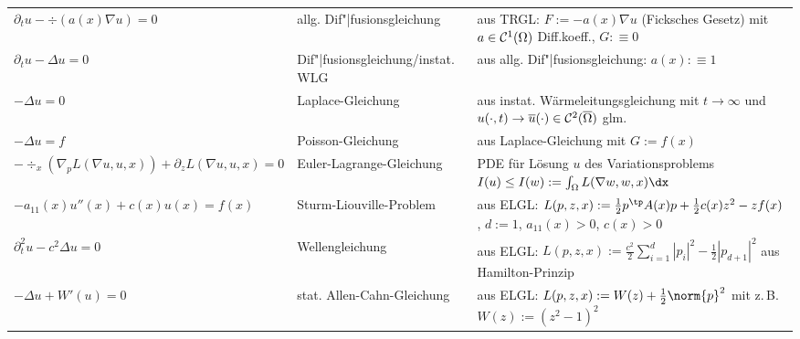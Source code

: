 \begin{landscape}
\begin{tabular}{p{65mm}p{55mm}p{128mm}}
        \midrule

        $\partial_t u - \div(a(x) \nabla u) = 0$&
        allg. Dif"|fusionsgleichung&
        aus TRGL: $F := -a(x) \nabla u$ (Ficksches Gesetz) mit $a \in \mathcal{C}^1(\Omega)$ Diff.koeff.,
        $G :\equiv 0$\\

        $\partial_t u - \Delta u = 0$&
        Dif"|fusionsgleichung/instat. WLG&
        aus allg. Dif"|fusionsgleichung: $a(x) :\equiv 1$\\

        $-\Delta u = 0$&
        Laplace-Gleichung&
        aus instat. Wärmeleitungsgleichung mit $t \to \infty$ und
        $u(\cdot, t) \to \overline{u}(\cdot) \in \mathcal{C}^2(\overline{\Omega})$ glm.\\

        $-\Delta u = f$&
        Poisson-Gleichung&
        aus Laplace-Gleichung mit $G := f(x)$\\

        \midrule

        $-\div_x(\nabla_p L(\nabla u, u, x)) + \partial_z L(\nabla u, u, x) = 0$&
        Euler-Lagrange-Gleichung&
        PDE für Lösung $u$ des Variationsproblems
        $I(u) \le I(w) := \int_\Omega L(\nabla w, w, x)\dx$\\

        $-a_{11}(x) u''(x) + c(x) u(x) = f(x)$&
        Sturm-Liouville-Problem&
        aus ELGL: $L(p, z, x) := \frac{1}{2} p^\tp A(x) p + \frac{1}{2} c(x) z^2 - z f(x)$,
        $d := 1$, $a_{11}(x) > 0$, $c(x) > 0$\\

        $\partial_t^2 u - c^2 \Delta u = 0$&
        Wellengleichung&
        aus ELGL: $L(p, z, x) := \frac{c^2}{2} \sum_{i=1}^d |p_i|^2 - \frac{1}{2} |p_{d+1}|^2$
        aus Hamilton-Prinzip\\

        $-\Delta u + W'(u) = 0$&
        stat. Allen-Cahn-Gleichung&
        aus ELGL: $L(p, z, x) := W(z) + \frac{1}{2} \norm{p}^2$ mit z.\,B. $W(z) := (z^2 - 1)^2$\\

        \bottomrule
    \end{tabular}
\end{landscape}

